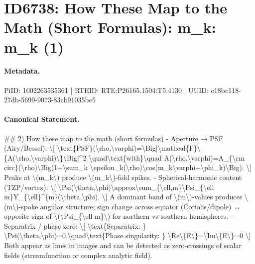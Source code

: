 \section*{ID6738: How These Map to the Math (Short Formulas): m\_k: m\_k (1)}
\paragraph{Metadata.}
PiID: 1002263535361 | RTEID: RTE:P26165.1504:T5.4130 | UUID: c18bc118-27db-5699-9073-83cb91035be5

\paragraph{Canonical Statement.}
\#\# 2) How these map to the math (short formulas) - Aperture → PSF (Airy/Bessel): \textbackslash{}[ \textbackslash{}text\{PSF\}(\textbackslash{}rho,\textbackslash{}varphi)=\textbackslash{}Big|\textbackslash{}mathcal\{F\}\textbackslash{}\{A(\textbackslash{}rho,\textbackslash{}varphi)\textbackslash{}\}\textbackslash{}Big|\textasciicircum{}2 \textbackslash{}quad\textbackslash{}text\{with\}\textbackslash{}quad A(\textbackslash{}rho,\textbackslash{}varphi)=A\_\{\textbackslash{}rm circ\}(\textbackslash{}rho)\textbackslash{}Big(1+\textbackslash{}sum\_k \textbackslash{}epsilon\_k(\textbackslash{}rho)\textbackslash{}cos(m\_k\textbackslash{}varphi+\textbackslash{}phi\_k)\textbackslash{}Big). \textbackslash{}] Peaks at \textbackslash{}(m\_k\textbackslash{}) produce \textbackslash{}(m\_k\textbackslash{})-fold spikes. - Spherical-harmonic content (TZP/vortex): \textbackslash{}[ \textbackslash{}Psi(\textbackslash{}theta,\textbackslash{}phi)\textbackslash{}approx\textbackslash{}sum\_\{\textbackslash{}ell,m\}\textbackslash{}Psi\_\{\textbackslash{}ell m\}Y\_\{\textbackslash{}ell\}\textasciicircum{}\{m\}(\textbackslash{}theta,\textbackslash{}phi). \textbackslash{}] A dominant band of \textbackslash{}(m\textbackslash{})-values produces \textbackslash{}(m\textbackslash{})-spoke angular structure; sign change across equator (Coriolis/dipole) ↔ opposite sign of \textbackslash{}(\textbackslash{}Psi\_\{\textbackslash{}ell m\}\textbackslash{}) for northern vs southern hemispheres. - Separatrix / phase zero: \textbackslash{}[ \textbackslash{}text\{Separatrix: \} \textbackslash{}Psi(\textbackslash{}theta,\textbackslash{}phi)=0,\textbackslash{}quad\textbackslash{}text\{Phase singularity: \} \textbackslash{}Re\textbackslash{}\{E\textbackslash{}\}=\textbackslash{}Im\textbackslash{}\{E\textbackslash{}\}=0 \textbackslash{}] Both appear as lines in images and can be detected as zero-crossings of scalar fields (streamfunction or complex analytic field).

